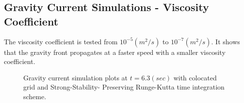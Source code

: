 \cp

\normalsize
\subsection{Gravity Current Simulations - Viscosity Coefficient}
The viscosity coefficient is tested from $10^{-5} (m^2/s)$ to $10^{-7} (m^2/s)$. It shows that the gravity front propagates at a faster speed with a smaller viscosity coefficient.
\begin{figure}[htbp]
  \begin{center}
\caption{Gravity current simulation plots at $t=6.3 (sec)$ with colocated grid  and Strong-Stability- Preserving Runge-Kutta time integration scheme.}
  \end{center}
\end{figure}


\cp

